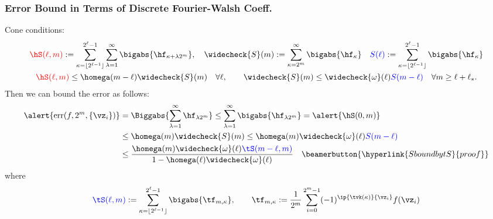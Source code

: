 \documentclass[10pt,compress]{beamer} %
\DeclareMathOperator{\err}{err}
\newcommand{\wcS}{\widecheck{S}}
\newcommand{\wcomega}{\widecheck{\omega}}
\begin{document}
\begin{frame}[label=errbdDFWT]\frametitle{Error Bound in Terms of Discrete Fourier-Walsh Coeff.}
Cone conditions:
\vspace{-1ex}
\begin{gather*}
{\color{red}\hS(\ell,m)}  := \sum_{\kappa=\lfloor 2^{\ell-1} \rfloor}^{2^{\ell}-1} \sum_{\lambda=1}^{\infty} \bigabs{ \hf_{\kappa+\lambda 2^{m}}}, \quad
\wcS(m) :=
\sum_{\kappa=2^{m}}^{\infty} \bigabs{\hf_{\kappa}} \quad 
{\color{blue}S(\ell)} :=  \sum_{\kappa=\lfloor 2^{\ell-1} \rfloor}^{2^{\ell}-1} \bigabs{\hf_{\kappa}}\\
{\color{red}\hS(\ell,m)} \le \homega(m-\ell) \wcS(m) \quad \forall \ell, \qquad 
\wcS(m) \le \wcomega(\ell) {\color{blue}S(m-\ell)} \quad \forall m \ge \ell+\ell_*.
\end{gather*}
Then we can bound the error as follows:
\begin{align*}
\alert{\err(f,2^m, \{\vz_i\})} & = \Biggabs{\sum_{\lambda=1}^{\infty} \hf_{\lambda 2^{m}}} \le \sum_{\lambda=1}^{\infty} \bigabs{\hf_{\lambda 2^{m}}} 
= \alert{\hS(0,m)}\\
& \le \homega(m) \wcS(m) \le \homega(m) \wcomega(\ell) {\color{blue}S(m-\ell)} \\
& \le \frac{\homega(m) \wcomega(\ell) {\color{blue}\tS(m-\ell,m)}}{1 - \homega(\ell) \wcomega(\ell)} \quad \beamerbutton{\hyperlink{SboundbytS}{proof}}
\end{align*}
where 
\[
{\color{blue}\tS(\ell,m)} :=\sum_{\kappa=\lfloor 2^{\ell-1} \rfloor}^{2^{\ell}-1} \bigabs{\tf_{m,\kappa}}, \qquad \tf_{m,\kappa}:= \frac{1}{2^m} \sum_{i=0}^{2^m-1} (-1)^{\ip{\tvk(\kappa)}{\vz_i}} f(\vz_i)
\]
\end{frame}
\end{document}
